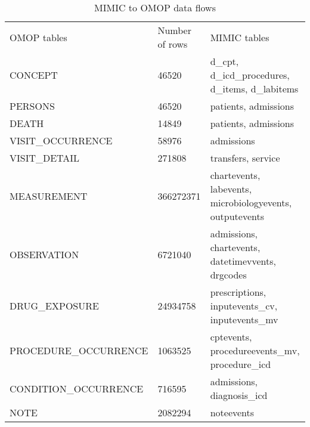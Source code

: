 

\begin{table*}[t]
\caption{MIMIC to OMOP data flows}
\begin{tabular}{@{}lll@{}}\toprule
OMOP tables           & Number of rows & MIMIC tables                                             \\\colrule
CONCEPT               & 46520          & d\_cpt, d\_icd\_procedures, d\_items, d\_labitems        \\
PERSONS               & 46520          & patients, admissions                                     \\
DEATH                 & 14849          & patients, admissions                                     \\
VISIT\_OCCURRENCE     & 58976          & admissions                                               \\
VISIT\_DETAIL         & 271808         & transfers, service                                       \\
MEASUREMENT           & 366272371      & chartevents, labevents, microbiologyevents, outputevents \\
OBSERVATION           & 6721040        & admissions, chartevents, datetimevvents, drgcodes        \\
DRUG\_EXPOSURE        & 24934758       & prescriptions, inputevents\_cv, inputevents\_mv          \\
PROCEDURE\_OCCURRENCE & 1063525        & cptevents, procedureevents\_mv, procedure\_icd           \\
CONDITION\_OCCURRENCE & 716595         & admissions, diagnosis\_icd                               \\
NOTE                  & 2082294        & noteevents                                               \\

\end{tabular}
\end{table*}
